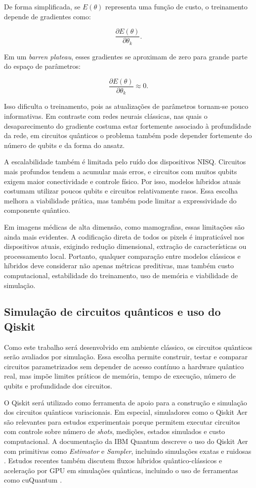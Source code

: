 \documentclass[
    12pt,
    openright,
    oneside,
    a4paper,
    english,
    brazil
]{abntex2}
\begin{document}
De forma simplificada, se \(E(\theta)\) representa uma função de custo, o treinamento depende de gradientes como:

\[
\frac{\partial E(\theta)}{\partial \theta_k}.
\]

Em um \textit{barren plateau}, esses gradientes se aproximam de zero para grande parte do espaço de parâmetros:

\[
\frac{\partial E(\theta)}{\partial \theta_k}
\approx 0.
\]

Isso dificulta o treinamento, pois as atualizações de parâmetros tornam-se pouco informativas. Em contraste com redes neurais clássicas, nas quais o desaparecimento do gradiente costuma estar fortemente associado à profundidade da rede, em circuitos quânticos o problema também pode depender fortemente do número de qubits e da forma do ansatz.

A escalabilidade também é limitada pelo ruído dos dispositivos NISQ. Circuitos mais profundos tendem a acumular mais erros, e circuitos com muitos qubits exigem maior conectividade e controle físico. Por isso, modelos híbridos atuais costumam utilizar poucos qubits e circuitos relativamente rasos. Essa escolha melhora a viabilidade prática, mas também pode limitar a expressividade do componente quântico.

Em imagens médicas de alta dimensão, como mamografias, essas limitações são ainda mais evidentes. A codificação direta de todos os pixels é impraticável nos dispositivos atuais, exigindo redução dimensional, extração de características ou processamento local. Portanto, qualquer comparação entre modelos clássicos e híbridos deve considerar não apenas métricas preditivas, mas também custo computacional, estabilidade do treinamento, uso de memória e viabilidade de simulação.

\subsection{Simulação de circuitos quânticos e uso do Qiskit}
\label{subsec:simulacao_circuitos_qiskit}

Como este trabalho será desenvolvido em ambiente clássico, os circuitos quânticos serão avaliados por simulação. Essa escolha permite construir, testar e comparar circuitos parametrizados sem depender de acesso contínuo a hardware quântico real, mas impõe limites práticos de memória, tempo de execução, número de qubits e profundidade dos circuitos.

O Qiskit será utilizado como ferramenta de apoio para a construção e simulação dos circuitos quânticos variacionais. Em especial, simuladores como o Qiskit Aer são relevantes para estudos experimentais porque permitem executar circuitos com controle sobre número de \textit{shots}, medições, estados simulados e custo computacional. A documentação da IBM Quantum descreve o uso do Qiskit Aer com primitivas como \textit{Estimator} e \textit{Sampler}, incluindo simulações exatas e ruidosas \cite{ibmQuantumAerSimulation2026}. Estudos recentes também discutem fluxos híbridos quântico-clássicos e aceleração por GPU em simulações quânticas, incluindo o uso de ferramentas como cuQuantum \cite{faj2023warpspeed,chen2024quantumhpcworkflow,bayraktar2023cuquantum}.
\end{document}
